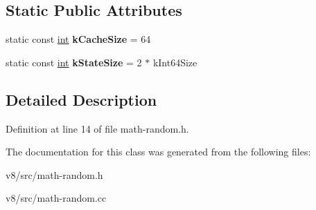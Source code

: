 \subsection*{Static Public Attributes}
\begin{DoxyCompactItemize}
\item 
\mbox{\label{classv8_1_1internal_1_1MathRandom_aaefb4d2df5627f1918da50fa94f13e2b}} 
static const \mbox{\hyperlink{classint}{int}} {\bfseries k\+Cache\+Size} = 64
\item 
\mbox{\label{classv8_1_1internal_1_1MathRandom_a83d22c10ee41af5b270c62cc73f9bc7e}} 
static const \mbox{\hyperlink{classint}{int}} {\bfseries k\+State\+Size} = 2 $\ast$ k\+Int64\+Size
\end{DoxyCompactItemize}


\subsection{Detailed Description}


Definition at line 14 of file math-\/random.\+h.



The documentation for this class was generated from the following files\+:\begin{DoxyCompactItemize}
\item 
v8/src/math-\/random.\+h\item 
v8/src/math-\/random.\+cc\end{DoxyCompactItemize}
